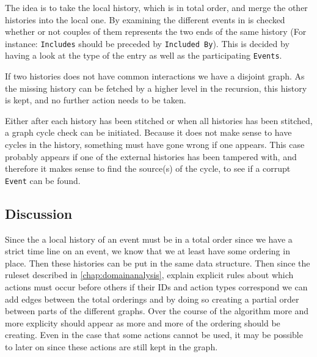 \newpar The idea is to take the local history, which is in total order, and merge the other histories into the local one. By examining the different events in is checked whether or not couples of them represents the two ends of the same history (For instance: \texttt{Includes} should be preceded by \texttt{Included By}). This is decided by having a look at the type of the entry as well as the participating \texttt{Events}.

\newpar If two histories does not have common interactions we have a disjoint graph. As the missing history can be fetched by a higher level in the recursion, this history is kept, and no further action needs to be taken.

\newpar Either after each history has been stitched or when all histories has been stitched, a graph cycle check can be initiated. Because it does not make sense to have cycles in the history, something must have gone wrong if one appears. This case probably appears if one of the external histories has been tampered with, and therefore it makes sense to find the source(s) of the cycle, to see if a corrupt \texttt{Event} can be found.

\subsection{Discussion} %
Since the a local history of an event must be in a total order since we have a strict time line on an event, we know that we at least have some ordering in place. Then these histories can be put in the same data structure. Then since the ruleset described in \autoref{chap:domainanalysis}, explain explicit rules about which actions must occur before others if their IDs and action types correspond we can add edges between the total orderings and by doing so creating a partial order between parts of the different graphs. Over the course of the algorithm more and more explicity should appear as more and more of the ordering should be creating. Even in the case that some actions cannot be used, it may be possible to later on since these actions are still kept in the graph. %

